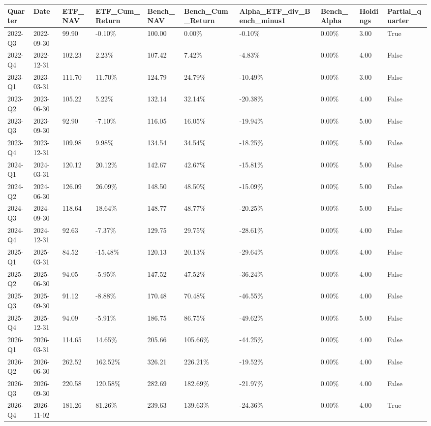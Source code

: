 \begin{longtable}{llllllllll}
Quarter & Date & ETF\_NAV & ETF\_Cum\_Return & Bench\_NAV & Bench\_Cum\_Return & Alpha\_ETF\_div\_Bench\_minus1 & Bench\_Alpha & Holdings & Partial\_quarter \\
\hline
2022-Q3 & 2022-09-30 & 99.90 & -0.10\% & 100.00 & 0.00\% & -0.10\% & 0.00\% & 3.00 & True \\
2022-Q4 & 2022-12-31 & 102.23 & 2.23\% & 107.42 & 7.42\% & -4.83\% & 0.00\% & 4.00 & False \\
2023-Q1 & 2023-03-31 & 111.70 & 11.70\% & 124.79 & 24.79\% & -10.49\% & 0.00\% & 3.00 & False \\
2023-Q2 & 2023-06-30 & 105.22 & 5.22\% & 132.14 & 32.14\% & -20.38\% & 0.00\% & 4.00 & False \\
2023-Q3 & 2023-09-30 & 92.90 & -7.10\% & 116.05 & 16.05\% & -19.94\% & 0.00\% & 5.00 & False \\
2023-Q4 & 2023-12-31 & 109.98 & 9.98\% & 134.54 & 34.54\% & -18.25\% & 0.00\% & 5.00 & False \\
2024-Q1 & 2024-03-31 & 120.12 & 20.12\% & 142.67 & 42.67\% & -15.81\% & 0.00\% & 5.00 & False \\
2024-Q2 & 2024-06-30 & 126.09 & 26.09\% & 148.50 & 48.50\% & -15.09\% & 0.00\% & 5.00 & False \\
2024-Q3 & 2024-09-30 & 118.64 & 18.64\% & 148.77 & 48.77\% & -20.25\% & 0.00\% & 5.00 & False \\
2024-Q4 & 2024-12-31 & 92.63 & -7.37\% & 129.75 & 29.75\% & -28.61\% & 0.00\% & 4.00 & False \\
2025-Q1 & 2025-03-31 & 84.52 & -15.48\% & 120.13 & 20.13\% & -29.64\% & 0.00\% & 4.00 & False \\
2025-Q2 & 2025-06-30 & 94.05 & -5.95\% & 147.52 & 47.52\% & -36.24\% & 0.00\% & 4.00 & False \\
2025-Q3 & 2025-09-30 & 91.12 & -8.88\% & 170.48 & 70.48\% & -46.55\% & 0.00\% & 4.00 & False \\
2025-Q4 & 2025-12-31 & 94.09 & -5.91\% & 186.75 & 86.75\% & -49.62\% & 0.00\% & 5.00 & False \\
2026-Q1 & 2026-03-31 & 114.65 & 14.65\% & 205.66 & 105.66\% & -44.25\% & 0.00\% & 4.00 & False \\
2026-Q2 & 2026-06-30 & 262.52 & 162.52\% & 326.21 & 226.21\% & -19.52\% & 0.00\% & 4.00 & False \\
2026-Q3 & 2026-09-30 & 220.58 & 120.58\% & 282.69 & 182.69\% & -21.97\% & 0.00\% & 4.00 & False \\
2026-Q4 & 2026-11-02 & 181.26 & 81.26\% & 239.63 & 139.63\% & -24.36\% & 0.00\% & 4.00 & True \\
\end{longtable}

